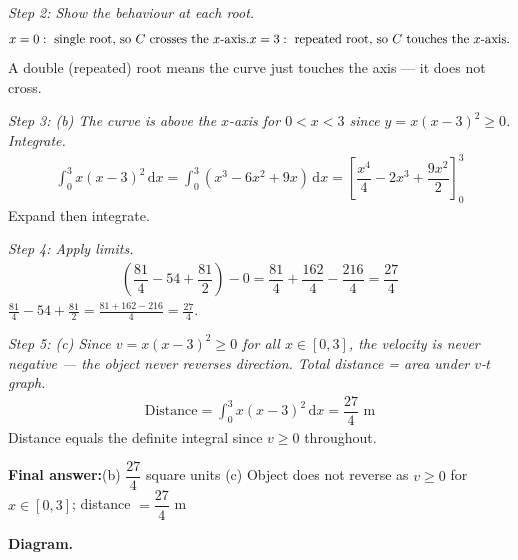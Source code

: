 \documentclass[11pt]{article}
\begin{document}
\textit{Step 2: Show the behaviour at each root.}
\[\begin{gathered}
x = 0: \text{ single root, so } C \text{ crosses the } x\text{-axis.}\newline x = 3: \text{ repeated root, so } C \text{ touches the } x\text{-axis.}
\end{gathered}\]
A double (repeated) root means the curve just touches the axis --- it does not cross.

\textit{Step 3: (b) The curve is above the \( x \)-axis for \( 0 < x < 3 \) since \( y = x(x-3)^2 \geq 0 \). Integrate.}
\[\begin{gathered}
\int_0^3 x(x-3)^2\, \mathrm{d}x = \int_0^3 (x^3 - 6x^2 + 9x)\, \mathrm{d}x = \left[\dfrac{x^4}{4} - 2x^3 + \dfrac{9x^2}{2}\right]_0^3
\end{gathered}\]
Expand then integrate.

\textit{Step 4: Apply limits.}
\[\begin{gathered}
\left(\dfrac{81}{4} - 54 + \dfrac{81}{2}\right) - 0 = \dfrac{81}{4} + \dfrac{162}{4} - \dfrac{216}{4} = \dfrac{27}{4}
\end{gathered}\]
\( \tfrac{81}{4} - 54 + \tfrac{81}{2} = \tfrac{81 + 162 - 216}{4} = \tfrac{27}{4} \).

\textit{Step 5: (c) Since \( v = x(x-3)^2 \geq 0 \) for all \( x \in [0,3] \), the velocity is never negative --- the object never reverses direction. Total distance = area under \( v \)-\( t \) graph.}
\[\begin{gathered}
\text{Distance} = \int_0^3 x(x-3)^2\, \mathrm{d}x = \dfrac{27}{4} \text{ m}
\end{gathered}\]
Distance equals the definite integral since \( v \geq 0 \) throughout.

\begin{answerbox}
\textbf{Final answer:}\quad (b) \(\displaystyle \dfrac{27}{4}\) square units   (c) Object does not reverse as \(\displaystyle v \geq 0\) for \(\displaystyle x \in [0,3]\); distance \(\displaystyle = \dfrac{27}{4}\) m
\end{answerbox}
\textbf{Diagram.}
\end{document}
